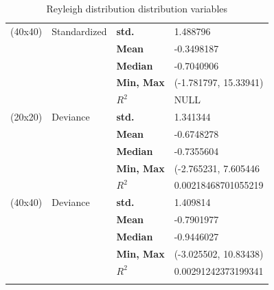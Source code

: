 \documentclass[12pt,a4paper,twoside]{article}
\begin{document}
\begin{longtable}{l|p{}|p{}|p{}}
    \hline
    (40x40)             & Standardized           & \textbf{std.}          &  1.488796              \\
                        &                        & \textbf{Mean}          & -0.3498187             \\
                        &                        & \textbf{Median}        & -0.7040906             \\
                        &                        & \textbf{Min, Max}      & (-1.781797, 15.33941)  \\
                        &                        & \textbf{$R^2$}         &  NULL                  \\
    \hline
    (20x20)             & Deviance               & \textbf{std.}          &  1.341344              \\
                        &                        & \textbf{Mean}          & -0.6748278             \\
                        &                        & \textbf{Median}        & -0.7355604             \\
                        &                        & \textbf{Min, Max}      & (-2.765231, 7.605446   \\
                        &                        & \textbf{$R^2$}         &  0.00218468701055219   \\
    \hline
    (40x40)             & Deviance               & \textbf{std.}          &  1.409814              \\
                        &                        & \textbf{Mean}          & -0.7901977             \\
                        &                        & \textbf{Median}        & -0.9446027             \\
                        &                        & \textbf{Min, Max}      &  (-3.025502, 10.83438) \\
                        &                        & \textbf{$R^2$}         &  0.00291242373199341   \\
    \caption{Reyleigh distribution distribution variables}
	\label{tab:gammavaltab}
\end{longtable}
\end{document}
